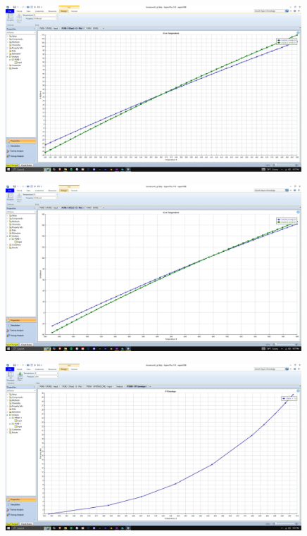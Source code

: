 \documentclass{article}
\begin{document}
\begin{figure}[H]
    \centering
    \includegraphics[width=0.99\textwidth, frame]{img/7.JPG}
\end{figure}

\begin{figure}[H]
    \centering
    \includegraphics[width=0.99\textwidth, frame]{img/8.JPG}
\end{figure}

\begin{figure}[H]
    \centering
    \includegraphics[width=0.99\textwidth, frame]{img/9.JPG}
\end{figure}
\end{document}
